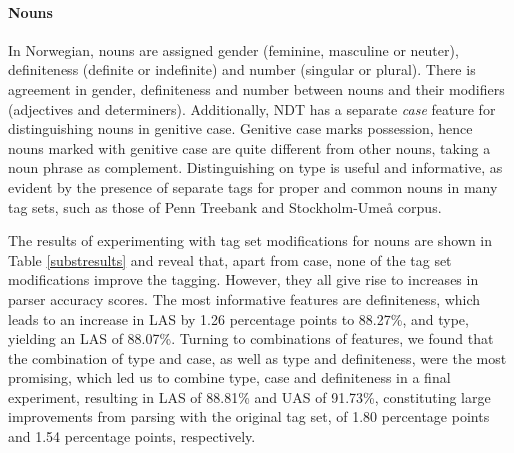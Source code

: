 \documentclass[11pt,a4paper]{article}
\begin{document}
\paragraph{Nouns}
In Norwegian, nouns are assigned gender (feminine, masculine or neuter),
definiteness (definite or indefinite) and number (singular or plural). There is
agreement in gender, definiteness and number between nouns and their modifiers
(adjectives and determiners). Additionally, NDT has a separate \emph{case}
feature for distinguishing nouns in genitive case. Genitive case marks
possession, hence nouns marked with genitive case are quite different from
other nouns, taking a noun phrase as complement. Distinguishing on type is
useful and informative, as evident by the presence of separate tags for proper
and common nouns in many tag sets, such as those of Penn Treebank and
Stockholm-Umeå corpus.

The results of experimenting with tag set modifications
for nouns are shown in Table \ref{substresults} and reveal that, apart from
case, none of the tag set modifications improve the tagging. However, they all
give rise to increases in parser accuracy scores.
The most informative features are definiteness, which
leads to an increase in LAS by 1.26 percentage points to 88.27\%, and type,
yielding an LAS of 88.07\%. Turning to combinations of features, we found that
the combination of type and case, as well as type and definiteness, were the
most promising, which led us to combine type, case and definiteness in a final
experiment, resulting in LAS of 88.81\% and UAS of 91.73\%, constituting large
improvements from parsing with the original tag set, of 1.80 percentage points
and 1.54 percentage points, respectively.
\end{document}
